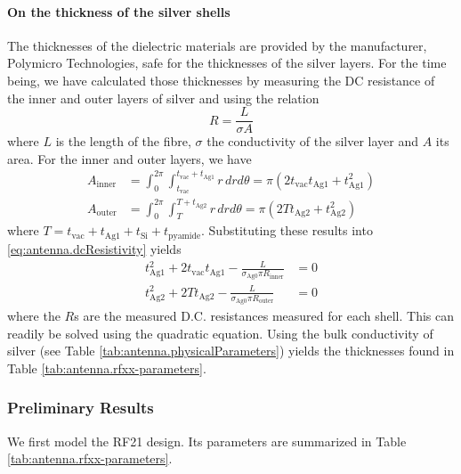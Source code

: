 \paragraph*{On the thickness of the silver shells}
The thicknesses of the dielectric materials are provided by the manufacturer, 
Polymicro Technologies, safe for the thicknesses of the silver layers. 
For the time being, we have calculated those thicknesses by measuring
the DC resistance of the inner and outer layers of silver and
using the relation \cite[p.~204]{CHE1989}
  \begin{equation}
    \label{eq:antenna.dcResistivity}
    R = \frac{L}{\sigma A}
  \end{equation}
where $L$ is the length of the fibre, $\sigma$ the conductivity of the silver
layer and $A$ its area. For the inner and outer layers, we have
  \begin{align}
    A_\text{inner}	&= \int_0^{2\pi}\int_{t_\text{vac}}^{t_\text{vac}+t_\text{Ag1}}r\,dr d\theta= \pi\left(2t_\text{vac}t_\text{Ag1}+t_\text{Ag1}^2\right)	\\
    A_\text{outer}	&= \int_0^{2\pi}\int_T^{T+t_\text{Ag2}}r\,dr d\theta = \pi\left(2Tt_\text{Ag2}+t_\text{Ag2}^2\right)
  \end{align}
where $T=t_\text{vac}+t_\text{Ag1}+t_\text{Si}+t_\text{pyamide}$. 
Substituting these results into \eqref{eq:antenna.dcResistivity}
yields
  \begin{subequations}
  \label{eq:antenna:thickGeneralEquations}
  \begin{align}  
   t_\text{Ag1}^2 + 2t_\text{vac}t_\text{Ag1}-\frac{L}{\sigma_\text{Ag0}\pi R_\text{inner}}	&=0	\\
   t_\text{Ag2}^2 + 2Tt_\text{Ag2}-\frac{L}{\sigma_\text{Ag0}\pi R_\text{outer}}			&=0
  \end{align}
  \end{subequations}
where the $R$s are the measured D.C. resistances measured for each shell. 
This can readily be solved using the quadratic equation. Using the bulk conductivity
of silver (see Table \ref{tab:antenna.physicalParameters}) yields the 
thicknesses found in Table \ref{tab:antenna.rfxx-parameters}.

\subsubsection{Preliminary Results}
We first model the RF21 design. Its parameters are summarized in 
Table \ref{tab:antenna.rfxx-parameters}. 

